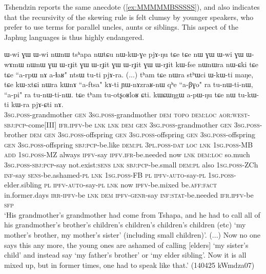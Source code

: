 Tshendzin reports the same anecdote (\ref{ex:MMMMMBSSSSS}), and also indicates that the recursivity of the skewing rule is felt clumsy by younger speakers, who prefer to use terms for parallel uncles, aunts or siblings. This aspect of the Japhug languages is thus highly endangered.
 
 \begin{exe}
\ex \label{ex:MMMMMBSSSSS}
\gll  ɯ-wi ɣɯ ɯ-wi nɯnɯ tsʰapa nɯtɕu nɯ-kɯ-ɣe pjɤ-ŋu tɕe tɕe nɯ ɣɯ ɯ-wi ɣɯ ɯ-wɤmɯ nɯnɯ ɣɯ ɯ-rɟit ɣɯ ɯ-rɟit ɣɯ ɯ-rɟit ɣɯ ɯ-rɟit kɯ-fse nɯnɯra nɯ-ɕki tɕe tɕe ``a-rpɯ nɤ a-ɬaʁ" ntsɯ tu-ti pjɤ-ra. (...) tʰam tɕe nɯra stʰɯci ɯ-kɯ-ti maŋe, tɕe kɯ-xtɕi nɯra kɯnɤ ``a-ftsa" kɤ-ti ɲɯ-nɤzraʁ-nɯ qʰe ``a-βɣo" ra tu-nɯ-ti-nɯ,  ``a-pi" ra tu-nɯ-ti-nɯ. tɕe tʰam tu-otʂoʁloʁ ɕti. kɯɕɯŋgɯ a-pɯ-ŋu tɕe nɯ tu-kɯ-ti kɯ-ra pjɤ-ɕti nɤ. \\
  \textsc{3sg}.\textsc{poss}-grandmother \textsc{gen}   \textsc{3sg}.\textsc{poss}-grandmother \textsc{dem}   \textsc{topo} \textsc{dem}:\textsc{loc} \textsc{aor}:\textsc{west}-\textsc{sbj}:\textsc{pcp}-come[III] \textsc{ifr}.\textsc{ipfv}-be \textsc{lnk} \textsc{lnk} \textsc{dem} \textsc{gen} \textsc{3sg}.\textsc{poss}-grandmother \textsc{gen} \textsc{3sg}.\textsc{poss}-brother \textsc{dem} \textsc{gen} \textsc{3sg}.\textsc{poss}-offspring  \textsc{gen} \textsc{3sg}.\textsc{poss}-offspring  \textsc{gen} \textsc{3sg}.\textsc{poss}-offspring  \textsc{gen} \textsc{3sg}.\textsc{poss}-offspring \textsc{sbj}:\textsc{pcp}-be.like \textsc{dem}:\textsc{pl} \textsc{3pl}.\textsc{poss}-\textsc{dat} \textsc{loc} \textsc{lnk} \textsc{1sg}.\textsc{poss}-MB \textsc{add} \textsc{1sg}.\textsc{poss}-MZ always \textsc{ipfv}-say \textsc{ipfv}.\textsc{ifr}-be.needed {  } now \textsc{lnk} \textsc{dem}:\textsc{loc} so.much \textsc{3sg}.\textsc{poss}-\textsc{sbj}:\textsc{pcp}-say not.exist:\textsc{sens} \textsc{lnk} \textsc{sbj}:\textsc{pcp}-be.small \textsc{dem}:\textsc{pl} also \textsc{1sg}.\textsc{poss}-ZCh \textsc{inf}-say \textsc{sens}-be.ashamed-\textsc{pl} \textsc{lnk} \textsc{1sg}.\textsc{poss}-FB \textsc{pl} \textsc{ipfv}-\textsc{auto}-say-\textsc{pl} \textsc{1sg}.\textsc{poss}-elder.sibling \textsc{pl} \textsc{ipfv}-\textsc{auto}-say-\textsc{pl}  \textsc{lnk} now \textsc{ipfv}-be.mixed be.\textsc{aff}:\textsc{fact} in.former.days \textsc{irr}-\textsc{ipfv}-be \textsc{lnk} \textsc{dem} \textsc{ipfv}-\textsc{genr}-say \textsc{inf}:\textsc{stat}-be.needed \textsc{ifr}.\textsc{ipfv}-be \textsc{sfp} \\
 \glt `His grandmother's grandmother had come from Tshapa, and he had to call all of his grandmother's brother's children's children's children's children (etc) `my mother's brother, my mother's sister' (including small children)'. (...) Now no one says this any more, the young ones are ashamed of calling [elders] `my sister's child' and instead say `my father's brother' or `my elder sibling'. Now it is all mixed up, but in former times, one had to speak like that.' (140425 kWmdza07)
 \end{exe}
 
